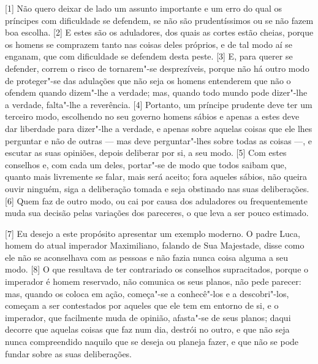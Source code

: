{[}1{]} Não quero deixar de lado um assunto importante e um erro do qual
os príncipes com dificuldade se defendem, se não são prudentíssimos ou
se não fazem boa escolha. {[}2{]} E estes são os aduladores, dos quais
as cortes estão cheias, porque os homens se comprazem tanto nas coisas
deles próprios, e de tal modo aí se enganam, que com dificuldade se
defendem desta peste. {[}3{]} E, para querer se defender, correm o risco
de tornarem"-se desprezíveis, porque não há outro modo de proteger"-se das
adulações que não seja os homens entenderem que não o ofendem quando
dizem"-lhe a verdade; mas, quando todo mundo pode dizer"-lhe a verdade,
falta"-lhe a reverência. {[}4{]} Portanto, um príncipe prudente deve ter
um terceiro modo, escolhendo no seu governo homens sábios e apenas a
estes deve dar liberdade para dizer"-lhe a verdade, e apenas sobre
aquelas coisas que ele lhes perguntar e não de outras --- mas deve
perguntar"-lhes sobre todas as coisas ---, e escutar as suas opiniões,
depois deliberar por si, a seu modo. {[}5{]} Com estes conselhos e, com
cada um deles, portar"-se de modo que todos saibam que, quanto mais
livremente se falar, mais será aceito; fora aqueles sábios, não queira
ouvir ninguém, siga a deliberação tomada e seja obstinado nas suas
deliberações. {[}6{]} Quem faz de outro modo, ou cai por causa dos
aduladores ou frequentemente muda sua decisão pelas variações dos
pareceres, o que leva a ser pouco estimado.

{[}7{]} Eu desejo a este propósito apresentar um exemplo moderno. O
padre Luca, homem do atual
imperador Maximiliano, falando de Sua Majestade, disse como ele
não se aconselhava com as pessoas e não fazia nunca coisa alguma a seu
modo. {[}8{]} O que resultava de ter contrariado os conselhos
supracitados, porque o imperador é homem reservado, não comunica os seus
planos, não pede parecer: mas, quando os coloca em ação, começa"-se a
conhecê"-los e a descobri"-los, começam a ser contestados por aqueles que
ele tem em entorno de si, e o imperador, que facilmente muda de opinião,
afasta"-se de seus planos; daqui decorre que aquelas coisas que faz num
dia, destrói no outro, e que não seja nunca compreendido naquilo que se
deseja ou planeja fazer, e que não se pode fundar sobre as suas
deliberações.

